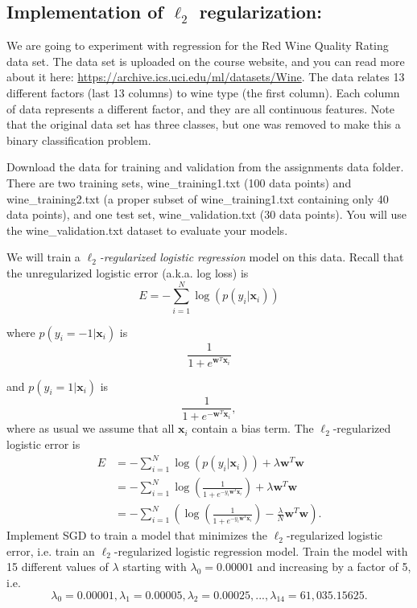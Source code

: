 \subsection{Implementation of \texorpdfstring{$\ell_2$}{L2} regularization:}

We are going to experiment with regression for the Red Wine Quality Rating data set. The data set is uploaded on the course website, and you can read more about it here: \url{https://archive.ics.uci.edu/ml/datasets/Wine}. The data relates 13 different factors (last 13 columns) to wine type (the first column). Each column of data represents a different factor, and they are all continuous features. Note that the original data set has three classes, but one was removed to make this a binary classification problem.

Download the data for training and validation from the assignments data folder.
There are two training sets, wine\_training1.txt (100 data points) and wine\_training2.txt (a proper subset of wine\_training1.txt containing only 40 data points), and one test set, wine\_validation.txt (30 data points). You will use the wine\_validation.txt dataset to evaluate your models.

We will train a \emph{$\ell_2$-regularized logistic regression} model on this data. Recall that the unregularized logistic error (a.k.a. log loss) is
\[E = -\sum_{i=1}^{N}\log(p(y_i | \mathbf{x}_i))\]

where $p(y_i = -1 | \mathbf{x}_i)$ is
\[\frac{1}{1 + e^{\mathbf{w}^T\mathbf{x}_i}}\]

and $p(y_i = 1 | \mathbf{x}_i)$ is
\[\frac{1}{1 + e^{-\mathbf{w}^T\mathbf{x}_i}},\]
where as usual we assume that all $\mathbf{x}_i$ contain a bias term.
The $\ell_2$-regularized logistic error is 
\begin{align*}
  E &= -\sum_{i=1}^{N}\log(p(y_i | \mathbf{x}_i)) + \lambda\mathbf{w}^T\mathbf{w} \\
    &= -\sum_{i=1}^{N} \log \left( \frac{1}{1 + e^{-y_i\mathbf{w}^T\mathbf{x}_i}} \right) + \lambda\mathbf{w}^T\mathbf{w} \\
    &= -\sum_{i=1}^{N} \left(\log \left( \frac{1}{1 + e^{-y_i\mathbf{w}^T\mathbf{x}_i}} \right) - \frac{\lambda}{N}\mathbf{w}^T\mathbf{w}\right).
\end{align*}
Implement SGD to train a model that minimizes the $\ell_2$-regularized logistic error, i.e. train an $\ell_2$-regularized logistic regression model.  Train the model with 15 different values of $\lambda$ starting with $\lambda_0 = 0.00001$ and increasing by a factor of 5, i.e. $$\lambda_0 = 0.00001, \lambda_1 = 0.00005, \lambda_2 = 0.00025, ..., \lambda_{14} = 61,035.15625.$$
\par

